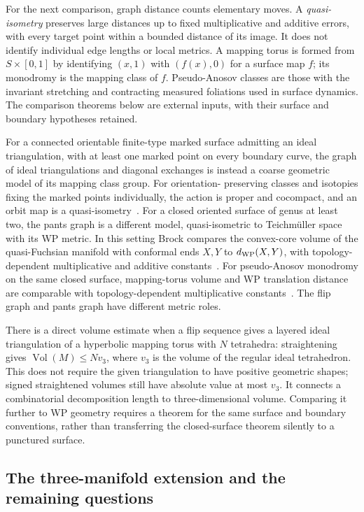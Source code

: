 For the next comparison, graph distance counts elementary moves.
A \emph{quasi-isometry} preserves large distances up to fixed
multiplicative and additive errors, with every target point within
a bounded distance of its image. It does not identify individual
edge lengths or local metrics. A mapping torus is formed from
$S\times[0,1]$ by identifying $(x,1)$ with $(f(x),0)$ for a surface
map $f$; its monodromy is the mapping class of $f$.
Pseudo-Anosov classes are those with the invariant stretching and
contracting measured foliations used in surface dynamics. The
comparison theorems below are external inputs, with their surface
and boundary hypotheses retained.

For a connected orientable finite-type marked surface admitting an ideal
triangulation, with at least one marked point on every boundary curve,
the graph of ideal triangulations and diagonal exchanges is instead
a coarse geometric model of its mapping class group. For orientation-
preserving classes and isotopies fixing the marked points individually,
the action is proper and cocompact, and an
orbit map is a quasi-isometry~\cite[Section~2.1, Lemma~2.3]{DisarloParlier}.
For a closed oriented surface of genus at least two, the pants graph is
a different model, quasi-isometric to Teichm\"uller space with its WP
metric. In this setting Brock compares the convex-core volume of the
quasi-Fuchsian manifold with conformal ends $X,Y$ to $d_{\rm WP}(X,Y)$,
with topology-dependent multiplicative and additive
constants~\cite[Theorems~1.1--1.2]{BrockWPVolumes}.
For pseudo-Anosov monodromy on the same closed surface, mapping-torus
volume and WP translation distance are comparable with topology-dependent
multiplicative constants~\cite[Theorem~1.1]{BrockMappingTori}.
The flip graph and pants graph have different metric roles.

There is a direct volume estimate when a flip sequence gives a layered
ideal triangulation of a hyperbolic mapping torus with $N$ tetrahedra:
straightening gives $\operatorname{Vol}(M)\le Nv_3$, where $v_3$ is the
volume of the regular ideal tetrahedron. This does not require the
given triangulation to have positive geometric shapes; signed
straightened volumes still have absolute value at most $v_3$.
It connects a combinatorial decomposition length to three-dimensional
volume. Comparing it further to WP geometry requires a theorem for the
same surface and boundary conventions, rather than transferring the
closed-surface theorem silently to a punctured surface.

\subsection{The three-manifold extension and the remaining questions}
\label{subsec:ipolyThreeManifolds}

